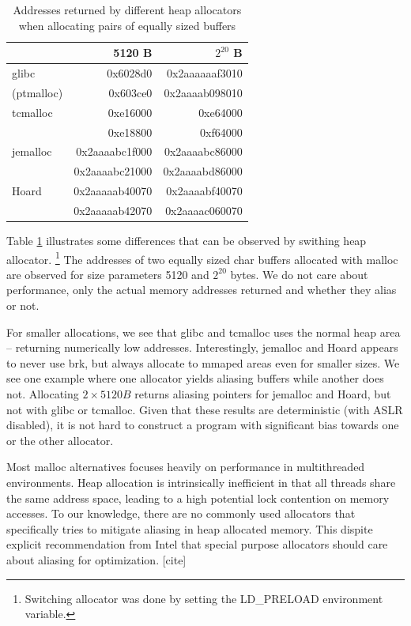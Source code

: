 \documentclass[a4paper,10pt,twocolumn,twoside]{article}
\begin{document}
\begin{table}[t]
  \caption{Addresses returned by different heap allocators when allocating pairs of equally sized buffers}
  \label{tab:mallocompare}
  \centering
  \small
  \begin{tabular}{l r r}
    \toprule
                      & 5120 B          & $2^{20}$ B \\
    \midrule
    glibc             & 0x6028d0        & 0x2aaaaaaf3010 \\
    (ptmalloc)        & 0x603ce0        & 0x2aaaab098010 \\
    \midrule
    tcmalloc          & 0xe16000        & 0xe64000 \\
                      & 0xe18800        & 0xf64000 \\
    \midrule
    jemalloc          & 0x2aaaabc1f000  & 0x2aaaabc86000 \\
                      & 0x2aaaabc21000  & 0x2aaaabd86000 \\
    \midrule
    Hoard             & 0x2aaaaab40070  & 0x2aaaabf40070 \\
                      & 0x2aaaaab42070  & 0x2aaaac060070 \\
    \bottomrule
  \end{tabular}
\end{table}

Table \ref{tab:mallocompare} illustrates some differences that can be observed by swithing heap allocator. \footnote{Switching allocator was done by setting the LD\_PRELOAD environment variable.}
The addresses of two equally sized char buffers allocated with malloc are observed for size parameters 5120 and $2^{20}$ bytes. 
We do not care about performance, only the actual memory addresses returned and whether they alias or not.

For smaller allocations, we see that glibc and tcmalloc uses the normal heap area -- returning numerically low addresses.
Interestingly, jemalloc and Hoard appears to never use brk, but always allocate to mmaped areas even for smaller sizes.
We see one example where one allocator yields aliasing buffers while another does not. 
Allocating $2 \times 5120 B$ returns aliasing pointers for jemalloc and Hoard, but not with glibc or tcmalloc.
Given that these results are deterministic (with ASLR disabled), it is not hard to construct a program with significant bias towards one or the other allocator.

Most malloc alternatives focuses heavily on performance in multithreaded environments.
Heap allocation is intrinsically inefficient in that all threads share the same address space, leading to a high potential lock contention on memory accesses.
To our knowledge, there are no commonly used allocators that specifically tries to mitigate aliasing in heap allocated memory.
This dispite explicit recommendation from Intel that special purpose allocators should care about aliasing for optimization. [cite]
\end{document}
